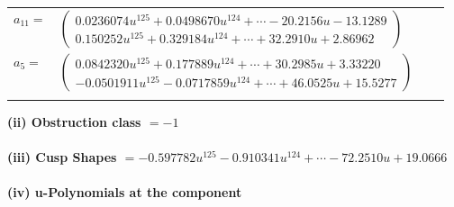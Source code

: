 \documentclass[1p]{elsarticle_modified}
\theoremstyle{definition}
\begin{document}
\begin{tabular}{m{7pt} m{180pt} m{7pt} m{180pt} }
\flushright $a_{11}=$&$\begin{pmatrix}0.0236074 u^{125}+0.0498670 u^{124}+\cdots-20.2156 u-13.1289\\0.150252 u^{125}+0.329184 u^{124}+\cdots+32.2910 u+2.86962\end{pmatrix}$ \\
\flushright $a_{5}=$&$\begin{pmatrix}0.0842320 u^{125}+0.177889 u^{124}+\cdots+30.2985 u+3.33220\\-0.0501911 u^{125}-0.0717859 u^{124}+\cdots+46.0525 u+15.5277\end{pmatrix}$\\&\end{tabular}
\flushleft \textbf{(ii) Obstruction class $= -1$}\\~\\
\flushleft \textbf{(iii) Cusp Shapes $= -0.597782 u^{125}-0.910341 u^{124}+\cdots-72.2510 u+19.0666$}\\~\\
\newpage\renewcommand{\arraystretch}{1}
\flushleft \textbf{(iv) u-Polynomials at the component}\newline \\
\end{document}
